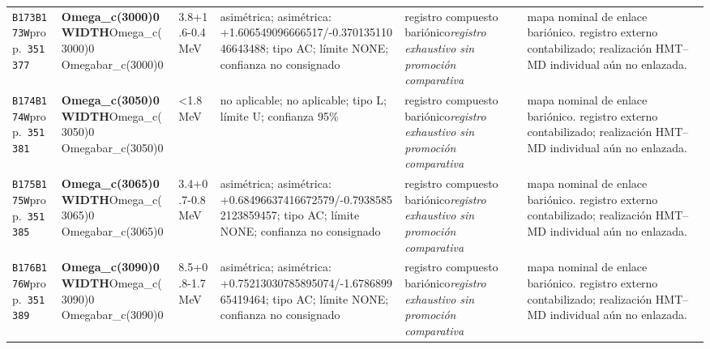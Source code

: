 \begin{landscape}
\begin{longtable}{L{1.85cm}L{4.45cm}L{2.35cm}L{4.05cm}L{3.35cm}L{7.15cm}}
\texttt{B173}\newline \texttt{B173W}\newline prop.\ \texttt{351377} & \textbf{Omega\_\allowbreak{}c(3000)0 WIDTH}\newline Omega\_\allowbreak{}c(3000)0 \textbar{}\allowbreak{} Omegabar\_\allowbreak{}c(3000)0 & 3.8+1.6-0.4\,MeV & asimétrica; asimétrica: +1.606549096666517/-0.37013511046643488; tipo AC; límite NONE; confianza no consignado & registro compuesto bariónico\newline \emph{registro exhaustivo sin promoción comparativa} & mapa nominal de enlace bariónico. registro externo contabilizado; realización HMT--MD individual aún no enlazada. \\
\texttt{B174}\newline \texttt{B174W}\newline prop.\ \texttt{351381} & \textbf{Omega\_\allowbreak{}c(3050)0 WIDTH}\newline Omega\_\allowbreak{}c(3050)0 \textbar{}\allowbreak{} Omegabar\_\allowbreak{}c(3050)0 & \textless{}1.8\,MeV & no aplicable; no aplicable; tipo L; límite U; confianza 95\% & registro compuesto bariónico\newline \emph{registro exhaustivo sin promoción comparativa} & mapa nominal de enlace bariónico. registro externo contabilizado; realización HMT--MD individual aún no enlazada. \\
\texttt{B175}\newline \texttt{B175W}\newline prop.\ \texttt{351385} & \textbf{Omega\_\allowbreak{}c(3065)0 WIDTH}\newline Omega\_\allowbreak{}c(3065)0 \textbar{}\allowbreak{} Omegabar\_\allowbreak{}c(3065)0 & 3.4+0.7-0.8\,MeV & asimétrica; asimétrica: +0.68496637416672579/-0.79385852123859457; tipo AC; límite NONE; confianza no consignado & registro compuesto bariónico\newline \emph{registro exhaustivo sin promoción comparativa} & mapa nominal de enlace bariónico. registro externo contabilizado; realización HMT--MD individual aún no enlazada. \\
\texttt{B176}\newline \texttt{B176W}\newline prop.\ \texttt{351389} & \textbf{Omega\_\allowbreak{}c(3090)0 WIDTH}\newline Omega\_\allowbreak{}c(3090)0 \textbar{}\allowbreak{} Omegabar\_\allowbreak{}c(3090)0 & 8.5+0.8-1.7\,MeV & asimétrica; asimétrica: +0.75213030785895074/-1.678689965419464; tipo AC; límite NONE; confianza no consignado & registro compuesto bariónico\newline \emph{registro exhaustivo sin promoción comparativa} & mapa nominal de enlace bariónico. registro externo contabilizado; realización HMT--MD individual aún no enlazada. \\

\end{longtable}
\end{landscape}
